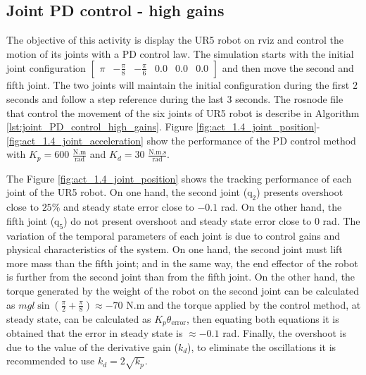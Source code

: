 \subsection{Joint PD control - high gains}
The objective of this activity is display the UR5 robot on rviz and control the motion of its joints with a PD control law. The simulation  starts with the initial joint configuration $\begin{bmatrix} \pi & -\frac{\pi}{8} & -\frac{\pi}{6} & 0.0 & 0.0 & 0.0 \end{bmatrix}$ and then move the second and fifth joint. The two joints will maintain the initial configuration during the first $2$ seconds and follow a step reference during the last $3$ seconds. The rosnode file that control the movement of the six joints of UR5 robot is describe in Algorithm \ref{lst:joint_PD_control_high_gains}. Figure \ref{fig:act_1.4_joint_position}-\ref{fig:act_1.4_joint_acceleration} show the performance of the PD control method with $K_p=600$ $\mathrm{\frac{N.m}{rad}}$ and $K_d=30$ $\mathrm{\frac{N.m.s}{rad}}$. 

The Figure \ref{fig:act_1.4_joint_position} shows the tracking performance of each joint of the UR5 robot. On one hand, the second joint ($\mathrm{q}_2$) presents overshoot close to $25\%$ and steady state error close to $-0.1$ rad. On the other hand, the fifth joint ($\mathrm{q}_5$) do not present overshoot and steady state error close to $0$ rad. The variation of the temporal parameters of each joint is due to control gains and physical characteristics of the system. On one hand, the second joint must lift more mass than the fifth joint; and in the same way, the end effector of the robot is further from the second joint than from the fifth joint. On the other hand, the torque generated by the weight of the robot on the second joint can be calculated as $m g l \sin({\frac{\pi}{2} + \frac{\pi}{8}}) \approx -70$ N.m and the torque applied by the control method, at steady state, can be calculated as $K_p \theta_{\mathrm{error}}$, then equating both equations it is obtained that the error in steady state is $\approx -0.1$ rad. Finally, the overshoot is due to the value of the derivative gain ($k_d$), to eliminate the oscillations it is recommended to use $k_d = 2 \sqrt{k_p}$. 


